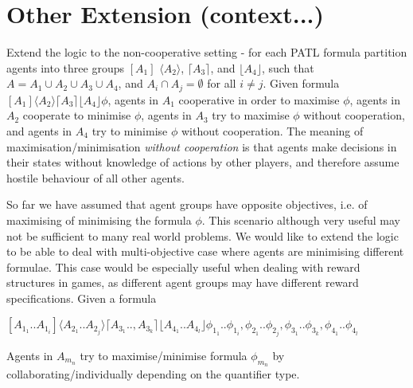 \documentclass{llncs}
\begin{document}
\section{Other Extension (context...)}

Extend the logic to the non-cooperative setting - for each PATL formula partition agents into three groups $[A_1]$ $\langle A_2 \rangle$, $\lceil A_3\rceil$, and $\lfloor A_4\rfloor$, such that $A = A_1 \cup A_2 \cup A_3 \cup A_4$, and $A_i \cap A_j = \emptyset$ for all $i\neq j$. Given formula $[A_1] \langle A_2 \rangle \lceil A_3\rceil \lfloor A_4 \rfloor \phi$, agents in $A_1$ cooperative in order to maximise $\phi$, agents in $A_2$ cooperate to minimise $\phi$, agents in $A_3$ try to maximise $\phi$ without cooperation, and agents in $A_4$ try to minimise $\phi$ without cooperation. The meaning of maximisation/minimisation \emph{without cooperation} is that agents make decisions in their states without knowledge of actions by other players, and therefore assume hostile behaviour of all other agents.

So far we have assumed that agent groups have opposite objectives, i.e. of maximising of minimising the formula $\phi$. This scenario although very useful may not be sufficient to many real world problems. We would like to extend the logic to be able to deal with multi-objective case where agents are minimising different formulae. This case would be especially useful when dealing with reward structures in games, as different agent groups may have different reward specifications. Given a formula


$[A_{1_1}..A_{1_i}] \langle A_{2_1}.. A_{2_j} \rangle \lceil A_{3_1} ..,A_{3_k}\rceil \lfloor A_{4_1} .. A_{4_l} \rfloor \phi_{1_1} .. \phi_{1_i}, \phi_{2_1} .. \phi_{2_j}, \phi_{3_1} ..\phi_{3_k},  \phi_{4_1} .. \phi_{4_l}$

\noindent
Agents in $A_{m_n}$ try to maximise/minimise formula $\phi_{m_n}$ by collaborating/individually depending on the quantifier type.
\end{document}
